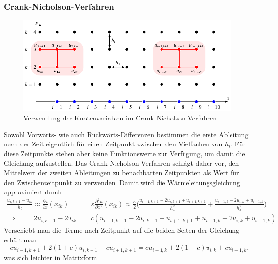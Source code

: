 \subsubsection{Crank-Nicholson-Verfahren}
\begin{figure}
\centering
\includegraphics{chapters/70-pde/images/cngrid.pdf}
\caption{Verwendung der Knotenvariablen im Crank-Nicholson-Verfahren.
\label{buch:pde:figure:cngrid}}
\end{figure}
Sowohl Vorwärts- wie auch Rückwärts-Differenzen bestimmen die erste
Ableitung nach der Zeit eigentlich für einen Zeitpunkt zwischen 
den Vielfachen von $h_t$.
Für diese Zeitpunkte stehen aber keine Funktionswerte zur Verfügung, 
um damit die Gleichung aufzustellen.
Das Crank-Nicholson-Verfahren schlägt daher vor, den Mittelwert der
zweiten Ableitungen zu benachbarten Zeitpunkten als Wert für den
Zwischenzeitpunkt zu verwenden.
Damit wird die Wärmeleitungsgleichung approximiert durch
\begin{align*}
\frac{u_{i,k+1}-u_{ik}}{h_t}
\approx
\frac{\partial u}{\partial x}(x_{ik})
&=
\kappa
\frac{\partial^2 u}{\partial x^2}(x_{ik})
\approx
\frac{\kappa}2\biggl(
\frac{u_{i-1,k+1}-2u_{i,k+1}+u_{i+1,k+1}}{h_x^2}
+
\frac{u_{i-1,k}-2u_{i,k}+u_{i+1,k}}{h_x^2}
\biggr)
\\
\Rightarrow\hspace{1cm}
2u_{i,k+1}-2u_{ik}
&=
c(
u_{i-1,k+1}-2u_{i,k+1}+u_{i+1,k+1}
+
u_{i-1,k}-2u_{i,k}+u_{i+1,k}
)
\end{align*}
Verschiebt man die Terme nach Zeitpunkt auf die beiden Seiten
der Gleichung erhält man
\begin{equation}
-cu_{i-1,k+1}+2(1+c)u_{i,k+1}-cu_{i+1,k+1}
=
cu_{i-1,k}+2(1-c)u_{i,k}+cu_{i+1,k},
\end{equation}
was sich leichter in Matrixform 
